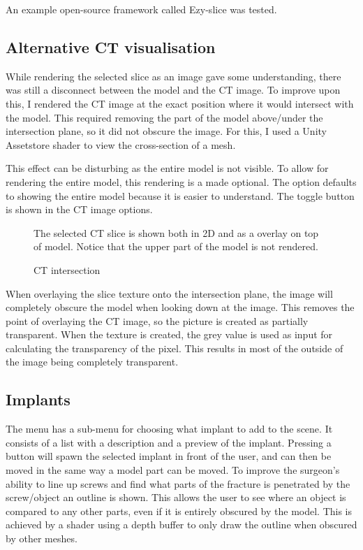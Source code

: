 \documentclass[a4paper]{report}
\begin{document}
An example open-source framework called Ezy-slice\cite{aryan} was tested.

\subsection{Alternative CT visualisation}
While rendering the selected slice as an image gave some understanding, there was still a disconnect between the model and the CT image. To improve upon this, I rendered the CT image at the exact position where it would intersect with the model.
This required removing the part of the model above/under the intersection plane, so it did not obscure the image. For this, I used a Unity Assetstore shader to view the cross-section of a mesh\cite{aldandarawy_unity_2019}.

This effect can be disturbing as the entire model is not visible. To allow for rendering the entire model, this rendering is a made optional. The option defaults to showing the entire model because it is easier to understand.
The toggle button is shown in the CT image options.

\begin{figure}[h!]
    \centering
	\hfill
  \caption{CT intersection}
  \small
  The selected CT slice is shown both in 2D and as a overlay on top of model. Notice that the upper part of the model is not rendered.
\end{figure}

When overlaying the slice texture onto the intersection plane, the image will completely obscure the model when looking down at the image. This removes the point of overlaying the CT image, so the picture is created as partially transparent. When the texture is created, the grey value is used as input for calculating the transparency of the pixel. This results in most of the outside of the image being completely transparent.

\subsection{Implants}
The menu has a sub-menu for choosing what implant to add to the scene. It consists of a list with a description and a preview of the implant. Pressing a button will spawn the selected implant in front of the user, and can then be moved in the same way a model part can be moved.
To improve the surgeon's ability to line up screws and find what parts of the fracture is penetrated by the screw/object an outline is shown. This allows the user to see where an object is compared to any other parts, even if it is entirely obscured by the model. This is achieved by a shader using a depth buffer to only draw the outline when obscured by other meshes\cite{shader depth}.
\end{document}
